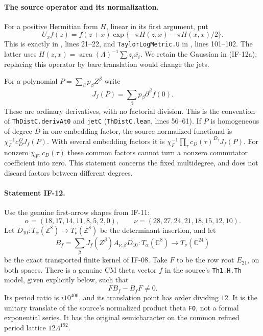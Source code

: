 \documentclass[11pt,a4paper]{article}
\theoremstyle{definition}
\theoremstyle{remark}
\begin{document}
\paragraph{The source operator and its normalization.}
For a positive Hermitian form $H$, linear in its first argument, put
\[
 U_x f(z)=f(z+x)\exp\{-\pi H(z,x)-\pi H(x,x)/2\}.       \tag{IF-12a}
\]
This is exactly  in
, lines 21--22,
and \texttt{TaylorLogMetric.U} in
,
lines 101--102. The latter uses
$H(z,x)=\operatorname{area}(\Lambda)^{-1}\sum z_i\overline{x_i}$.
We retain the Gaussian in (IF-12a); replacing this operator by bare
translation would change the jets.

For a polynomial $P=\sum_\beta p_\beta Z^\beta$ write
\[
 J_f(P)=\sum_\beta p_\beta\partial^\beta f(0).
                                                               \tag{IF-12b}
\]
These are ordinary derivatives, with no factorial division. This is
the convention of \texttt{ThDistC.derivAt0} and \texttt{jetC}
(\texttt{ThDistC.lean}, lines 56--61). If $P$ is homogeneous of degree $D$ in one
embedding factor, the source normalized functional is
$\chi_F^{-1}c_D^D J_f(P)$. With several embedding factors it is
$\chi_F^{-1}\prod_\tau c_D(\tau)^{D_\tau}J_f(P)$.
For nonzero $\chi_F,c_D(\tau)$ these common factors cannot turn a
nonzero commutator coefficient into zero. This statement concerns the
fixed multidegree, and does not discard factors between different
degrees.

\paragraph{Statement IF-12.}
Use the genuine first-arrow shapes from IF-11:
\[
 \alpha=(18,17,14,11,8,5,2,0),\qquad
 \nu=(28,27,24,21,18,15,12,10).
\]
Let $D_{10}:T_\alpha(\mathbb Z^8)\longrightarrow
T_\nu(\mathbb Z^8)$ be the determinant insertion, and let
\[
 B_f=\sum_\beta J_f(Z^\beta)A_{\nu,\beta}D_{10}:
 T_\alpha(\mathbb C^8)\longrightarrow T_\nu(\mathbb C^{24})
                                                               \tag{IF-12c}
\]
be the exact transported finite kernel of IF-08. Take $F$ to be the
row root $E_{21}$, on both spaces. There is a genuine CM theta vector
$f$ in the source's \texttt{Th1.H.Th} model, given explicitly below,
such that
\[
                 F B_f-B_f F\ne0.                            \tag{IF-12d}
\]
Its period ratio is $i10^{400}$, and its translation point has order
dividing $12$. It is the unitary translate of the source's normalized
product theta \texttt{F0}, not a formal exponential series. It has
the original semicharacter on the common refined period lattice
$12\Lambda^{192}$.
\end{document}
